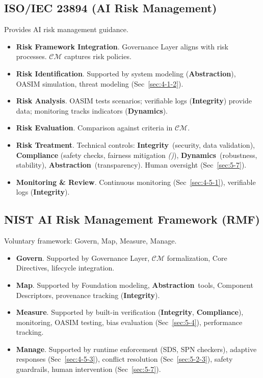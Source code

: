 \documentclass[12pt,a4paper]{report}
\renewcommand{\citep}[1]{\textit{\scriptsize{(\cite{#1})}}}
\newcommand{\Integrity}{\textbf{Integrity}}
\newcommand{\Abstraction}{\textbf{Abstraction}}
\newcommand{\Dynamics}{\textbf{Dynamics}}
\begin{document}
	\subsection{ISO/IEC 23894 (AI Risk Management)}
	\label{app:compmap_iso23894}
	
	Provides AI risk management guidance.
	
	\begin{itemize}
		\item \textbf{Risk Framework Integration}. Governance Layer aligns with risk processes. $\mathcal{CM}$ captures risk policies.
		\item \textbf{Risk Identification}. Supported by system modeling (\Abstraction), OASIM simulation, threat modeling (Sec~\ref{sec:4-1-2}).
		\item \textbf{Risk Analysis}. OASIM tests scenarios; verifiable logs (\Integrity) provide data; monitoring tracks indicators (\Dynamics).
		\item \textbf{Risk Evaluation}. Comparison against criteria in $\mathcal{CM}$.
		\item \textbf{Risk Treatment}. Technical controls: \Integrity\ (security, data validation), \textbf{Compliance} (safety checks, fairness mitigation \citep{Navigating_AI_Conformity_2025}), \Dynamics\ (robustness, stability), \Abstraction\ (transparency). Human oversight (Sec~\ref{sec:5-7}).
		\item \textbf{Monitoring \& Review}. Continuous monitoring (Sec~\ref{sec:4-5-1}), verifiable logs (\Integrity).
	\end{itemize}
	
	\subsection{NIST AI Risk Management Framework (RMF)}
	\label{app:compmap_nist_ai_rmf}
	
	Voluntary framework: Govern, Map, Measure, Manage.
	
	\begin{itemize}
		\item \textbf{Govern}. Supported by Governance Layer, $\mathcal{CM}$ formalization, Core Directives, lifecycle integration.
		\item \textbf{Map}. Supported by Foundation modeling, \Abstraction\ tools, Component Descriptors, provenance tracking (\Integrity).
		\item \textbf{Measure}. Supported by built-in verification (\Integrity, \textbf{Compliance}), monitoring, OASIM testing, bias evaluation (Sec~\ref{sec:5-4}), performance tracking.
		\item \textbf{Manage}. Supported by runtime enforcement (SDS, SPN checkers), adaptive responses (Sec~\ref{sec:4-5-3}), conflict resolution (Sec~\ref{sec:5-2-3}), safety guardrails, human intervention (Sec~\ref{sec:5-7}).
	\end{itemize}
	
\end{document}
